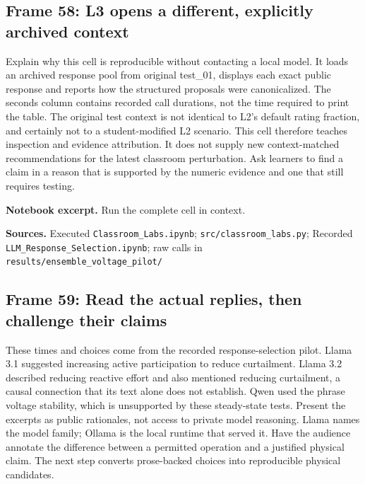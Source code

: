 \documentclass[11pt]{article}
\begin{document}
\subsection*{Frame 58: L3 opens a different, explicitly archived context}
Explain why this cell is reproducible without contacting a local model. It loads an archived response pool from original test\_01, displays each exact public response and reports how the structured proposals were canonicalized. The seconds column contains recorded call durations, not the time required to print the table. The original test context is not identical to L2's default rating fraction, and certainly not to a student-modified L2 scenario. This cell therefore teaches inspection and evidence attribution. It does not supply new context-matched recommendations for the latest classroom perturbation. Ask learners to find a claim in a reason that is supported by the numeric evidence and one that still requires testing.\par
\par\noindent\begin{minipage}{\linewidth}\textbf{Notebook excerpt.} Run the complete cell in context.\par \end{minipage}\par
\par\nopagebreak\begin{minipage}{\linewidth}{\footnotesize\color{slate}\textbf{Sources.} Executed \texttt{Classroom\_Labs.ipynb}; \texttt{src/classroom\_labs.py}; Recorded \texttt{LLM\_Response\_Selection.ipynb}; raw calls in \texttt{results/ensemble\_voltage\_pilot/}\par}\end{minipage}\par\medskip
\subsection*{Frame 59: Read the actual replies, then challenge their claims}
These times and choices come from the recorded response-selection pilot. Llama 3.1 suggested increasing active participation to reduce curtailment. Llama 3.2 described reducing reactive effort and also mentioned reducing curtailment, a causal connection that its text alone does not establish. Qwen used the phrase voltage stability, which is unsupported by these steady-state tests. Present the excerpts as public rationales, not access to private model reasoning. Llama names the model family; Ollama is the local runtime that served it. Have the audience annotate the difference between a permitted operation and a justified physical claim. The next step converts prose-backed choices into reproducible physical candidates.\par
\end{document}
